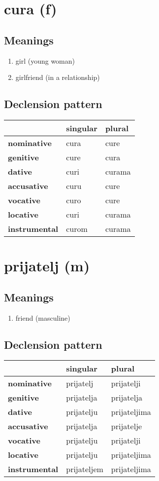 \filbreak
\section{cura (f)}
\subsection*{Meanings}
\begin{enumerate}
\item girl (young woman)
\item girlfriend (in a relationship)
\end{enumerate}
\subsection*{Declension pattern}
\begin{tabularx}{\linewidth}{Xll}
\toprule
{} & singular &  plural \\
\midrule
\textbf{nominative  } &     cura &    cure \\
\textbf{genitive    } &     cure &    cura \\
\textbf{dative      } &     curi &  curama \\
\textbf{accusative  } &     curu &    cure \\
\textbf{vocative    } &     curo &    cure \\
\textbf{locative    } &     curi &  curama \\
\textbf{instrumental} &    curom &  curama \\
\bottomrule
\end{tabularx}

\filbreak
\section{prijatelj (m)}
\subsection*{Meanings}
\begin{enumerate}
\item friend (masculine)
\end{enumerate}
\subsection*{Declension pattern}
\begin{tabularx}{\linewidth}{Xll}
\toprule
{} &     singular &        plural \\
\midrule
\textbf{nominative  } &    prijatelj &    prijatelji \\
\textbf{genitive    } &   prijatelja &    prijatelja \\
\textbf{dative      } &   prijatelju &  prijateljima \\
\textbf{accusative  } &   prijatelja &    prijatelje \\
\textbf{vocative    } &   prijatelju &    prijatelji \\
\textbf{locative    } &   prijatelju &  prijateljima \\
\textbf{instrumental} &  prijateljem &  prijateljima \\
\bottomrule
\end{tabularx}

